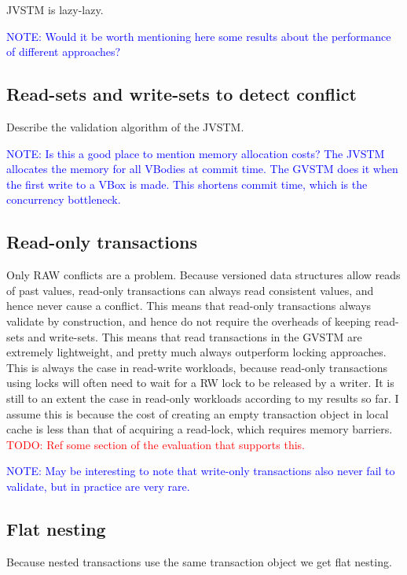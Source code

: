 \documentclass[12pt,a4paper,oneside,openright]{report}
\newcommand{\todo}[1]{\textcolor{red}{TODO: #1}}
\newcommand{\note}[1]{\textcolor{blue}{NOTE: #1}}
\begin{document}
JVSTM is lazy-lazy.

\note{Would it be worth mentioning here some results about the
  performance of different approaches?}

\subsection{Read-sets and write-sets to detect conflict}
\label{sec:impl:read-sets-write}

Describe the validation algorithm of the JVSTM.

\note{Is this a good place to mention memory allocation costs? The
  JVSTM allocates the memory for all VBodies at commit time. The GVSTM
  does it when the first write to a VBox is made. This shortens commit
  time, which is the concurrency bottleneck.}

\subsection{Read-only transactions}
\label{sec:impl:read-only-trans}

Only RAW conflicts are a problem. Because versioned data structures
allow reads of past values, read-only transactions can always read
consistent values, and hence never cause a conflict. This means that
read-only transactions always validate by construction, and hence do
not require the overheads of keeping read-sets and write-sets. This
means that read transactions in the GVSTM are extremely lightweight,
and pretty much always outperform locking approaches. This is always
the case in read-write workloads, because read-only transactions using
locks will often need to wait for a RW lock to be released by a
writer. It is still to an extent the case in read-only workloads
according to my results so far. I assume this is because the cost of
creating an empty transaction object in local cache is less than that
of acquiring a read-lock, which requires memory barriers.  \todo{Ref
  some section of the evaluation that supports this.}

\note{May be interesting to note that write-only transactions also
  never fail to validate, but in practice are very rare.}

\subsection{Flat nesting}
\label{sec:impl:flat-nesting}

Because nested transactions use the same transaction object we get
flat nesting.
\end{document}
